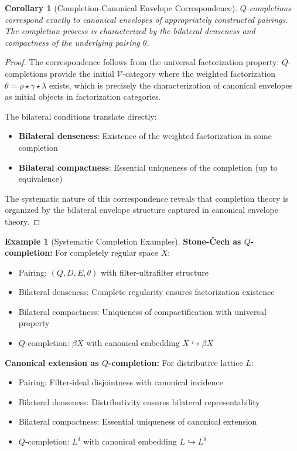 \documentclass[11pt]{article}
\theoremstyle{plain}
\newtheorem{corollary}[theorem]{Corollary}
\theoremstyle{definition}
\newtheorem{example}[theorem]{Example}
\theoremstyle{remark}
\newcommand{\V}{\mathcal{V}}
\begin{document}
\begin{corollary}[Completion-Canonical Envelope Correspondence]
$Q$-completions correspond exactly to canonical envelopes of appropriately constructed pairings. The completion process is characterized by the bilateral denseness and compactness of the underlying pairing $\theta$.
\end{corollary}

\begin{proof}
The correspondence follows from the universal factorization property: $Q$-completions provide the initial $\V$-category where the weighted factorization $\theta = \rho \star \gamma \star \lambda$ exists, which is precisely the characterization of canonical envelopes as initial objects in factorization categories.

The bilateral conditions translate directly:
\begin{itemize}
\item \textbf{Bilateral denseness}: Existence of the weighted factorization in some completion
\item \textbf{Bilateral compactness}: Essential uniqueness of the completion (up to equivalence)
\end{itemize}

The systematic nature of this correspondence reveals that completion theory is organized by the bilateral envelope structure captured in canonical envelope theory.
\end{proof}

\begin{example}[Systematic Completion Examples]
\textbf{Stone-\v{C}ech as $Q$-completion:} For completely regular space $X$:
\begin{itemize}
\item Pairing: $(Q, D, E, \theta)$ with filter-ultrafilter structure
\item Bilateral denseness: Complete regularity ensures factorization existence
\item Bilateral compactness: Uniqueness of compactification with universal property
\item $Q$-completion: $\beta X$ with canonical embedding $X \hookrightarrow \beta X$
\end{itemize}

\textbf{Canonical extension as $Q$-completion:} For distributive lattice $L$:
\begin{itemize}
\item Pairing: Filter-ideal disjointness with canonical incidence
\item Bilateral denseness: Distributivity ensures bilateral representability
\item Bilateral compactness: Essential uniqueness of canonical extension
\item $Q$-completion: $L^{\delta}$ with canonical embedding $L \hookrightarrow L^{\delta}$
\end{itemize}
\end{example}
\end{document}
